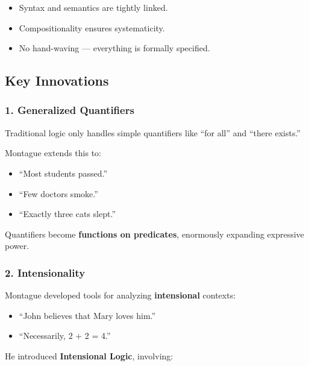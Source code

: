 \documentclass[12pt]{article}
\newcommand{\tightlist}{\itemsep 0pt\parskip 0pt\parsep 0pt}
\begin{document}
\begin{itemize}
\tightlist
\item
  Syntax and semantics are tightly linked.
\item
  Compositionality ensures systematicity.
\item
  No hand-waving --- everything is formally specified.
\end{itemize}

\hypertarget{key-innovations}{%
\subsection{Key Innovations}\label{key-innovations}}

\hypertarget{generalized-quantifiers}{%
\subsubsection{\texorpdfstring{1. \textbf{Generalized
Quantifiers}}{1. Generalized Quantifiers}}\label{generalized-quantifiers}}

Traditional logic only handles simple quantifiers like ``for all'' and
``there exists.''

Montague extends this to:

\begin{itemize}
\tightlist
\item
  ``Most students passed.''
\item
  ``Few doctors smoke.''
\item
  ``Exactly three cats slept.''
\end{itemize}

Quantifiers become \textbf{functions on predicates}, enormously
expanding expressive power.

\hypertarget{intensionality}{%
\subsubsection{\texorpdfstring{2.
\textbf{Intensionality}}{2. Intensionality}}\label{intensionality}}

Montague developed tools for analyzing \textbf{intensional} contexts:

\begin{itemize}
\tightlist
\item
  ``John believes that Mary loves him.''
\item
  ``Necessarily, 2 + 2 = 4.''
\end{itemize}

He introduced \textbf{Intensional Logic}, involving:
\end{document}
